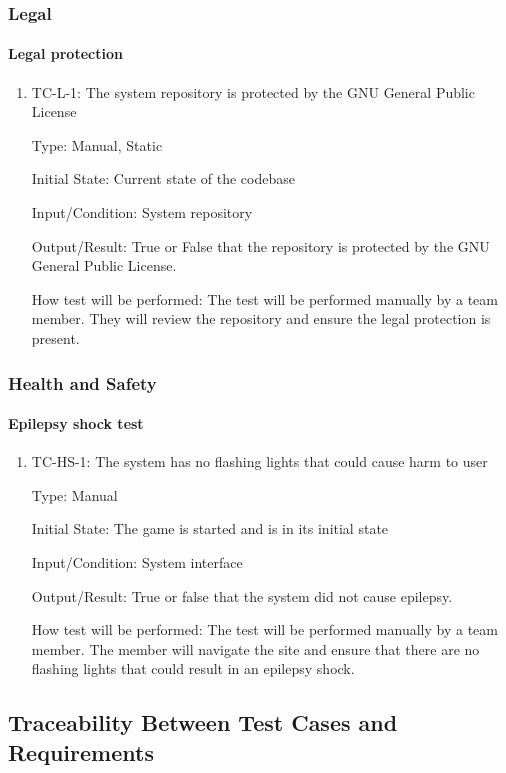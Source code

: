 \documentclass[12pt, titlepage]{article}
\begin{document}
\subsubsection{Legal}

\paragraph{Legal protection}
\begin{enumerate}
\item{TC-L-1: The system repository is protected by the GNU General Public License}

Type: Manual, Static
					
Initial State: Current state of the codebase
					
Input/Condition: System repository
					
Output/Result: True or False that the repository is protected by the GNU General Public License.
					
How test will be performed: The test will be performed manually by a team member. They will review the repository and ensure the legal protection is present.
\end{enumerate}

\subsubsection{Health and Safety}

\paragraph{Epilepsy shock test}
\begin{enumerate}
\item{TC-HS-1: The system has no flashing lights that could cause harm to user}

Type: Manual
					
Initial State: The game is started and is in its initial state
					
Input/Condition: System interface
					
Output/Result: True or false that the system did not cause epilepsy.
					
How test will be performed: The test will be performed manually by a team member. The member will navigate the site and ensure that there are no flashing lights that could result in an epilepsy shock.
\end{enumerate}

\subsection{Traceability Between Test Cases and Requirements}
\end{document}
